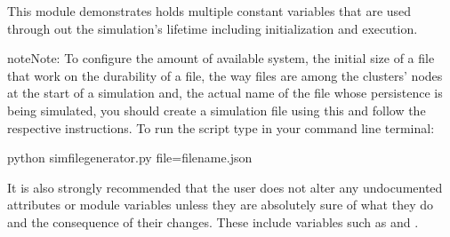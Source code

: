 \documentclass[letterpaper,10pt,english]{sphinxmanual}
\begin{document}
This module demonstrates holds multiple constant variables that are used
through out the simulation’s lifetime including initialization and execution.

\begin{sphinxadmonition}{note}{Note:}
To configure the amount of available
{\hyperref[\detokenize{app.domain:app.domain.network_nodes.Node}]{}} system,
the initial size of a file
{\hyperref[\detokenize{app.domain:app.domain.cluster_groups.Cluster}]{}} that
work on the durability of a file, the way files are
{\hyperref[\detokenize{app.domain:app.domain.cluster_groups.Cluster.spread_files}]{}}
among the clusters’ nodes at the start of a simulation and, the actual
name of the file whose persistence is being simulated, you should create
a simulation file using this {\hyperref[\detokenize{app:module-app.simfile_generator}]{}} and
follow the respective instructions. To run the script type in your
command line terminal:

\begin{DUlineblock}{0em}
\item[] 
\end{DUlineblock}

\begin{sphinxVerbatim}[commandchars=\\\{\}]
\PYGZdl{} python simfile\PYGZus{}generator.py \PYGZhy{}\PYGZhy{}file=filename.json
\end{sphinxVerbatim}

\begin{DUlineblock}{0em}
\item[] 
\end{DUlineblock}

It is also strongly recommended that the user does not alter any
undocumented attributes or module variables unless they are absolutely
sure of what they do and the consequence of their changes. These include
variables such as {\hyperref[\detokenize{app:app.environment_settings.SHARED_ROOT}]{}} and
{\hyperref[\detokenize{app:app.environment_settings.SIMULATION_ROOT}]{}}.
\end{sphinxadmonition}
\end{document}
